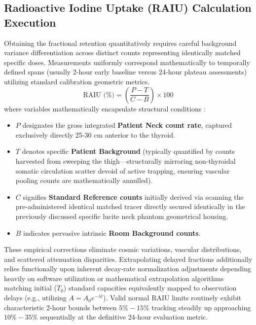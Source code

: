 \subsection{Radioactive Iodine Uptake (RAIU) Calculation Execution}
Obtaining the fractional retention quantitatively requires careful background variance differentiation across distinct counts representing identically matched specific doses. Measurements uniformly correspond mathematically to temporally defined spans (usually 2-hour early baseline versus 24-hour plateau assessments) utilizing standard calibration geometric metrics.
\begin{equation}
    \text{RAIU (\%)} = \left( \frac{P - T}{C - B} \right) \times 100
\end{equation}
where variables mathematically encapsulate structural conditions \cite{captus4000e}:
\begin{itemize}
    \item $P$ designates the gross integrated \textbf{Patient Neck count rate}, captured exclusively directly 25-30 cm anterior to the thyroid.
    \item $T$ denotes specific \textbf{Patient Background} (typically quantified by counts harvested from sweeping the thigh—structurally mirroring non-thyroidal somatic circulation scatter devoid of active trapping, ensuring vascular pooling counts are mathematically annulled).
    \item $C$ signifies \textbf{Standard Reference counts} initially derived via scanning the pre-administered identical matched tracer directly secured identically in the previously discussed specific lucite neck phantom geometrical housing.
    \item $B$ indicates pervasive intrinsic \textbf{Room Background counts}. 
\end{itemize}
These empirical corrections eliminate cosmic variations, vascular distributions, and scattered attenuation disparities. Extrapolating delayed fractions additionally relies functionally upon inherent decay-rate normalization adjustments depending heavily on software utilization or mathematical extrapolation algorithms matching initial ($T_0$) standard capacities equivalently mapped to observation delays (e.g., utilizing $A = A_0 e^{-\lambda t}$). Valid normal RAIU limits routinely exhibit characteristic 2-hour bounds between $5\% - 15\%$ tracking steadily up approaching $10\% - 35\%$ sequentially at the definitive 24-hour evaluation metric.
